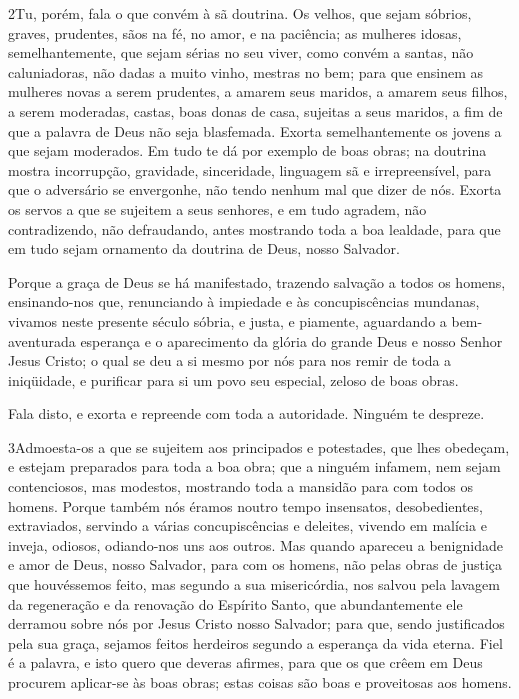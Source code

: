 \lettrine{2} Tu, porém, fala o que convém à sã doutrina.
Os velhos, que sejam sóbrios, graves, prudentes, sãos na fé, no
amor, e na paciência; as mulheres idosas, semelhantemente, que
sejam sérias no seu viver, como convém a santas, não caluniadoras,
não dadas a muito vinho, mestras no bem; para que ensinem as
mulheres novas a serem prudentes, a amarem seus maridos, a amarem
seus filhos, a serem moderadas, castas, boas donas de casa,
sujeitas a seus maridos, a fim de que a palavra de Deus não seja
blasfemada. Exorta semelhantemente os jovens a que sejam
moderados. Em tudo te dá por exemplo de boas obras; na doutrina
mostra incorrupção, gravidade, sinceridade, linguagem sã e
irrepreensível, para que o adversário se envergonhe, não tendo
nenhum mal que dizer de nós. Exorta os servos a que se sujeitem
a seus senhores, e em tudo agradem, não contradizendo, não
defraudando, antes mostrando toda a boa lealdade, para que em tudo
sejam ornamento da doutrina de Deus, nosso Salvador.

Porque a graça de Deus se há manifestado, trazendo salvação a
todos os homens, ensinando-nos que, renunciando à impiedade e
às concupiscências mundanas, vivamos neste presente século sóbria, e
justa, e piamente, aguardando a bem-aventurada esperança e o
aparecimento da glória do grande Deus e nosso Senhor Jesus Cristo;
o qual se deu a si mesmo por nós para nos remir de toda a
iniqüidade, e purificar para si um povo seu especial, zeloso de boas
obras.

Fala disto, e exorta e repreende com toda a autoridade. Ninguém
te despreze.

\medskip

\lettrine{3} Admoesta-os a que se sujeitem aos principados e
potestades, que lhes obedeçam, e estejam preparados para toda a boa
obra; que a ninguém infamem, nem sejam contenciosos, mas
modestos, mostrando toda a mansidão para com todos os homens.
Porque também nós éramos noutro tempo insensatos, desobedientes,
extraviados, servindo a várias concupiscências e deleites, vivendo
em malícia e inveja, odiosos, odiando-nos uns aos outros. Mas
quando apareceu a benignidade e amor de Deus, nosso Salvador, para
com os homens, não pelas obras de justiça que houvéssemos feito,
mas segundo a sua misericórdia, nos salvou pela lavagem da
regeneração e da renovação do Espírito Santo, que abundantemente
ele derramou sobre nós por Jesus Cristo nosso Salvador; para
que, sendo justificados pela sua graça, sejamos feitos herdeiros
segundo a esperança da vida eterna. Fiel é a palavra, e isto
quero que deveras afirmes, para que os que crêem em Deus procurem
aplicar-se às boas obras; estas coisas são boas e proveitosas aos
homens.

